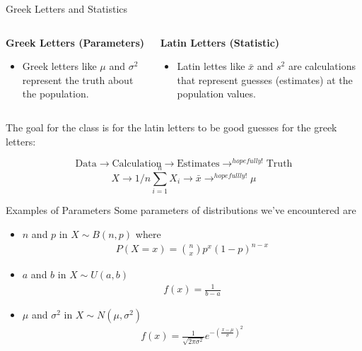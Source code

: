 \documentclass{beamer}
\begin{document}
\begin{frame}{Greek Letters and Statistics}
	\begin{columns}[onlytextwidth] %

		\begin{column}{.5\textwidth}
			\begin{center}
				\textbf{Greek Letters (Parameters)}
			\end{center}

			\begin{itemize}
				\item Greek letters like $\mu$ and $\sigma^2$ represent the truth about the population.
			\end{itemize}
		\end{column}%
		\hfill%

		\begin{column}{.5\textwidth}
			\begin{center}
				\textbf{Latin Letters (Statistic)}
			\end{center}

			\begin{itemize}
				\item Latin lettes like $\bar{x}$ and $s^2$ are calculations that represent guesses (estimates) at the population values.
			\end{itemize}
		\end{column}%
	\end{columns}
	
	\vspace{10mm}
	The goal for the class is for the latin letters to be good guesses for the greek letters:

	\[ 
		\text{Data} \longrightarrow \text{Calculation} \longrightarrow \text{Estimates} \longrightarrow^{hopefully!} \text{Truth}
	\]
	\[
		X \longrightarrow 1/n \sum_{i=1}^n X_i \longrightarrow \bar{x} \longrightarrow^{hopefullly!} \mu
	\]
\end{frame}

\begin{frame}{Examples of Parameters}
	Some parameters of distributions we've encountered are
	\begin{itemize}
		\item $n$ and $p$ in $X\sim B(n,p)$ where 
		\begin{align*}
			P(X=x)={n \choose x} p^x \left(1-p\right)^{n-x} 
		\end{align*}
		\item $a$ and $b$ in $X\sim U(a,b)$
		\begin{align*}
			f(x)=\frac{1}{b-a} 
		\end{align*}
		\item $\mu$ and $\sigma^2$ in $X\sim N(\mu,\sigma^2)$
		\begin{align*}
			f(x)=\frac{1}{\sqrt{2\pi\sigma^2}}e^{-\left(\frac{x-\mu}{\sigma}\right)^2} 
		\end{align*}
	\end{itemize}
\end{frame}
\end{document}
